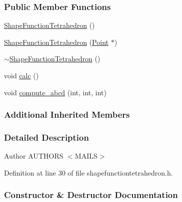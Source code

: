 \subsubsection*{Public Member Functions}
\begin{DoxyCompactItemize}
\item 
\hyperlink{classmknix_1_1_shape_function_tetrahedron_a470f6ba9b843785e1bd412f66830f201}{Shape\+Function\+Tetrahedron} ()
\item 
\hyperlink{classmknix_1_1_shape_function_tetrahedron_a0bbef63fdeaff7a06c33b29f0132c991}{Shape\+Function\+Tetrahedron} (\hyperlink{classmknix_1_1_point}{Point} $\ast$)
\item 
\hyperlink{classmknix_1_1_shape_function_tetrahedron_acd13333d97502dc1ab76178452beef76}{$\sim$\+Shape\+Function\+Tetrahedron} ()
\item 
void \hyperlink{classmknix_1_1_shape_function_tetrahedron_a9b09613d74f957f733a03bec83557850}{calc} ()
\item 
void \hyperlink{classmknix_1_1_shape_function_tetrahedron_a0173ff8fc55470c6d46684cd28eeb345}{compute\+\_\+abcd} (int, int, int)
\end{DoxyCompactItemize}
\subsubsection*{Additional Inherited Members}


\subsubsection{Detailed Description}
\begin{DoxyAuthor}{Author}
A\+U\+T\+H\+O\+R\+S $<$\+M\+A\+I\+L\+S$>$ 
\end{DoxyAuthor}


Definition at line 30 of file shapefunctiontetrahedron.\+h.



\subsubsection{Constructor \& Destructor Documentation}
\hypertarget{classmknix_1_1_shape_function_tetrahedron_a470f6ba9b843785e1bd412f66830f201}{}
